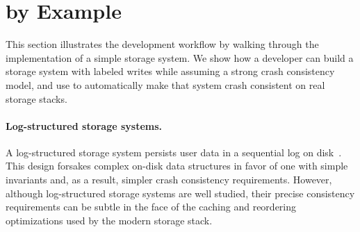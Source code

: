 \section{\depsynth by Example}
\label{s:overview}

This section illustrates the \depsynth development workflow
by walking through the implementation of a simple storage system.
We show how a developer can build a storage system with labeled writes
while assuming a strong crash consistency model,
and use \depsynth to automatically make that system crash consistent on real storage stacks.

\paragraph{Log-structured storage systems.}
A log-structured storage system
persists user data in a sequential log on disk~\cite{rosenblum:lfs}.
This design forsakes complex on-disk data structures
in favor of one with simple invariants and, as a result, simpler crash consistency requirements.
However, although log-structured storage systems are well studied,
their precise consistency requirements can be subtle
in the face of the caching and reordering optimizations used by the modern storage stack.

